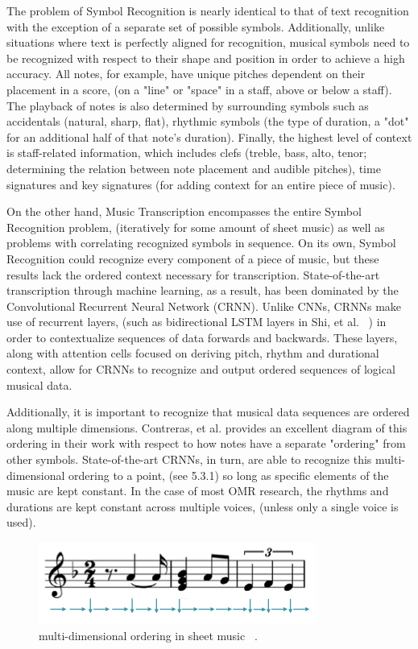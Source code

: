 \documentclass[nonacm, sigconf]{acmart}
\begin{document}
The problem of Symbol Recognition is nearly identical to that of text recognition with the exception of a separate set of possible symbols.
Additionally, unlike situations where text is perfectly aligned for recognition, musical symbols need to be recognized with respect to their shape and position in order to achieve a high accuracy.
All notes, for example, have unique pitches dependent on their placement in a score, (on a "line" or "space" in a staff, above or below a staff).
The playback of notes is also determined by surrounding symbols such as accidentals (natural, sharp, flat), rhythmic symbols (the type of duration, a "dot" for an additional half of that note's duration).
Finally, the highest level of context is staff-related information, which includes clefs (treble, bass, alto, tenor; determining the relation between note placement and audible pitches), time signatures and key signatures (for adding context for an entire piece of music).

On the other hand, Music Transcription encompasses the entire Symbol Recognition problem, (iteratively for some amount of sheet music) as well as problems with correlating recognized symbols in sequence.
On its own, Symbol Recognition could recognize every component of a piece of music, but these results lack the ordered context necessary for transcription.
State-of-the-art transcription through machine learning, as a result, has been dominated by the Convolutional Recurrent Neural Network (CRNN). 
Unlike CNNs, CRNNs make use of recurrent layers, (such as bidirectional LSTM layers in Shi, et al. ~\cite{shi2015endtoend}) in order to contextualize sequences of data forwards and backwards.
These layers, along with attention cells focused on deriving pitch, rhythm and durational context, allow for CRNNs to recognize and output ordered sequences of logical musical data.

Additionally, it is important to recognize that musical data sequences are ordered along multiple dimensions.
Contreras, et al. provides an excellent diagram of this ordering in their work with respect to how notes have a separate "ordering" from other symbols.
State-of-the-art CRNNs, in turn, are able to recognize this multi-dimensional ordering to a point, (see 5.3.1) so long as specific elements of the music are kept constant.
In the case of most OMR research, the rhythms and durations are kept constant across multiple voices, (unless only a single voice is used).

\begin{figure}
	\centering
	\includegraphics[width = .8\linewidth]{./figures/ordering.png}
	\caption{multi-dimensional ordering in sheet music ~\cite{contreras2023omrcnn}.}
	\label{fig:ordering}
\end{figure}
\end{document}
